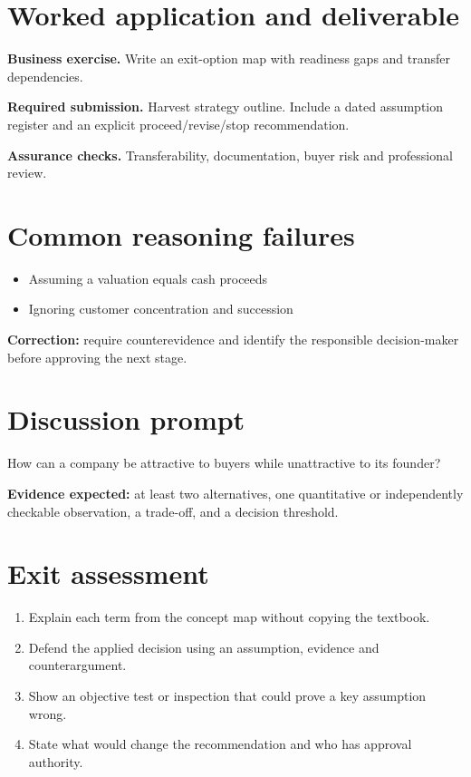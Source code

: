 \documentclass[11pt,letterpaper]{article}
\begin{document}
\section{Worked application and deliverable}
\textbf{Business exercise.} Write an exit-option map with readiness gaps and transfer dependencies.\par\textbf{Required submission.} Harvest strategy outline. Include a dated assumption register and an explicit proceed/revise/stop recommendation.\par\textbf{Assurance checks.} Transferability, documentation, buyer risk and professional review.
\section{Common reasoning failures}
\begin{itemize}[leftmargin=*,itemsep=3pt]
\item Assuming a valuation equals cash proceeds
\item Ignoring customer concentration and succession
\end{itemize}
\noindent\textbf{Correction:} require counterevidence and identify the responsible decision-maker before approving the next stage.
\section{Discussion prompt}
How can a company be attractive to buyers while unattractive to its founder?\par\medskip\textbf{Evidence expected:} at least two alternatives, one quantitative or independently checkable observation, a trade-off, and a decision threshold.
\section{Exit assessment}
\begin{enumerate}[leftmargin=*,itemsep=5pt]
\item Explain each term from the concept map without copying the textbook.
\item Defend the applied decision using an assumption, evidence and counterargument.
\item Show an objective test or inspection that could prove a key assumption wrong.
\item State what would change the recommendation and who has approval authority.
\end{enumerate}

\end{document}
